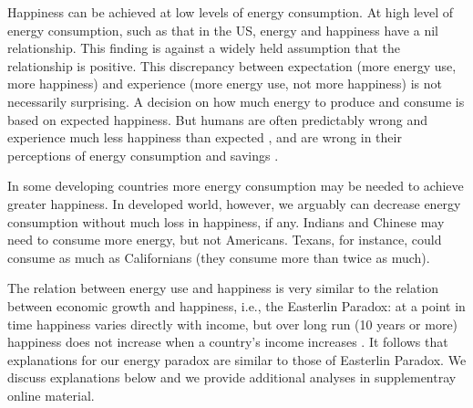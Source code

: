 \documentclass[10pt, letterpaper]{article}
\begin{document}
\begin{spacing}{1.5}

Happiness can be achieved at low levels of
energy consumption. At high level of energy consumption, such as
that in the  US, energy and happiness have a nil relationship. %
 This finding is against a widely held assumption that the relationship is
positive. This discrepancy between expectation (more energy use, more happiness)
and experience (more energy use, not more happiness) is not necessarily
 surprising. A decision on how much energy to produce and consume is based on
 expected happiness. But humans are often predictably wrong and experience much
 less happiness than expected \citep{kahneman97ws}, and are wrong
 in their perceptions of energy consumption and savings \citep{attari10,dietz14B}. 


In some developing countries more energy consumption may be needed to achieve greater happiness. In developed world, however, we
 arguably can decrease energy consumption without much loss in happiness, if any. %
Indians and Chinese may need to consume more energy, but not Americans. 
Texans, for instance,  could consume as much as Californians (they consume more than twice as
much). %

The relation between energy use and happiness is very similar to the relation
between economic growth and happiness, i.e., the Easterlin Paradox: at a point
in time happiness varies directly with income, but over long run (10 years or
more) happiness does not increase when a country's income increases
\citep{easterlin10B}. It follows that explanations for our energy paradox are
similar to those of Easterlin Paradox. We discuss explanations below and we
provide additional analyses in supplementray online material.


\end{spacing}
\end{document}

